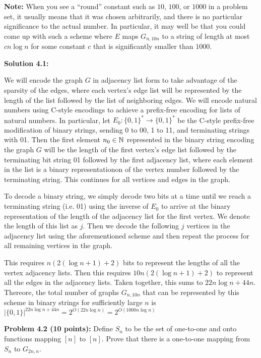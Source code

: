 \documentclass[11pt]{article}
\begin{document}
\textbf{Note:} When you see a ``round'' constant such as \(10\),
\(100\), or \(1000\) in a problem set, it usually means that it was
chosen arbitrarily, and there is no particular significance to the
actual number. In particular, it may well be that you could come up with
such a scheme where \(E\) maps \(G_{n, 10n}\) to a string of
length at most \(cn\log n\) for some constant \(c\) that is significantly
smaller than \(1000\).

\textbf{Solution 4.1:} %

We will encode the graph $G$ in adjacency list form to take advantage of the sparsity of the edges, where each vertex's edge list will be represented by the length of the list followed by the list of neighboring edges.
We will encode natural numbers using C-style encodings to achieve a prefix-free encoding for lists of natural numbers. In particular, let $E_0: \{0, 1\}^* \rightarrow \{0, 1\}^*$ be the C-style prefix-free modification of binary strings, sending 0 to 00, 1 to 11, and terminating strings with 01.
Then the first element $n_0 \in \mathbb{N}$ represented in the binary string encoding the graph $G$ will be the length of the first vertex's edge list followed by the terminating bit string 01 followed by the first adjacency list, where each element in the list is a binary representationon of the vertex number followed by the terminating string. This continues for all vertices and edges in the graph.

To decode a binary string, we simply decode two bits at a time until we reach a terminating string (i.e. 01) using the inverse of $E_0$ to arrive at the binary representation of the length of the adjacency list for the first vertex. We denote the length of this list as $j$. Then we decode the following $j$ vertices in the adjacency list using the aforementioned scheme and then repeat the process for all remaining vertices in the graph.

This requires $n(2(\log{n} + 1) + 2)$ bits to represent the lengths of all the vertex adjacency lists.
Then this requires $10n(2(\log{n} + 1) + 2)$ to represent all the edges in the adjacency lists. Taken together, this sums to $22n\log{n} + 44n$. Thereore, the total number of graphs \(G_{n, 10n}\) that can be represented by this scheme in binary strings for sufficiently large $n$ is $|\{0,1\}|^{22n\log{n} + 44n} = 2^{O(22n\log{n})} = 2^{O(1000n\log{n})}$

\textbf{Problem 4.2 (10 points):}  Define $S_n$ to be the
set of one-to-one and onto functions mapping $[n]$ to $[n]$.
Prove that there is a one-to-one mapping from $S_n$ to $G_{2n,n}$.
\end{document}
